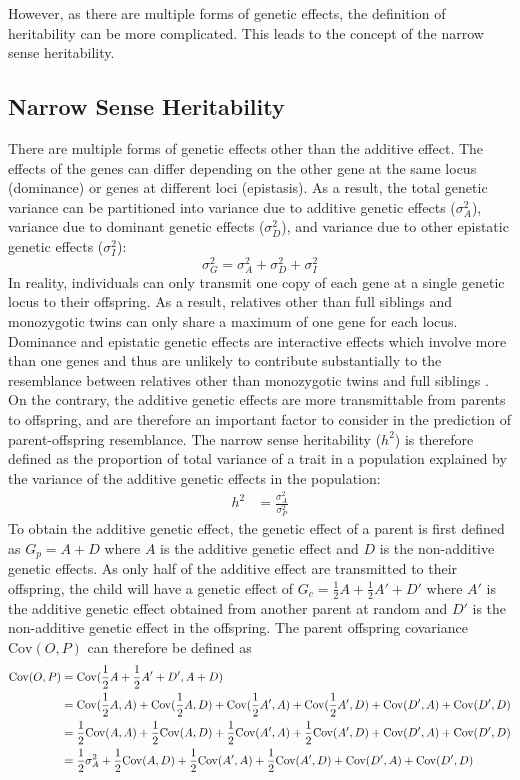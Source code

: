 \documentclass[12pt]{scrbook}
\begin{document}
However, as there are multiple forms of genetic effects, the definition of heritability can be more complicated. 
This leads to the concept of the narrow sense heritability.

\subsection{Narrow Sense Heritability}
There are multiple forms of genetic effects other than the additive effect. 
The effects of the genes can differ depending on the other gene at the same locus (dominance) or genes at different loci (epistasis).
As a result, the total genetic variance can be partitioned into variance due to additive genetic effects ($\sigma_A^2$), variance due to dominant genetic effects ($\sigma_D^2$), and variance due to other epistatic genetic effects ($\sigma_I^2$):
$$
\sigma_G^2=\sigma_A^2+\sigma_D^2+\sigma_I^2
$$
In reality, individuals can only transmit one copy of each gene at a single genetic locus to their offspring. 
As a result, relatives other than full siblings and monozygotic twins can only share a maximum of one gene for each locus. 
Dominance and epistatic genetic effects are interactive effects which involve more than one genes and thus are unlikely to contribute substantially to the resemblance between relatives other than monozygotic twins and full siblings \citep{Visscher2008}.
On the contrary, the additive genetic effects are more transmittable from parents to offspring, and are therefore an important factor to consider in the prediction of parent-offspring resemblance. 
The narrow sense heritability ($h^2$) is therefore defined as the proportion of total variance of a trait in a population explained by the variance of the additive genetic effects in the population:
\begin{align}
h^2&=\frac{\sigma_A^2}{\sigma_P^2}
\label{eq:narrowHeritability}
\end{align}
To obtain the additive genetic effect, the genetic effect of a parent is first defined as $G_p=A+D$ where $A$ is the additive genetic effect and $D$ is the non-additive genetic effects.
As only half of the additive effect are transmitted to their offspring, the child will have a genetic effect of $G_c=\frac{1}{2}A+\frac{1}{2}A'+D'$ where $A'$ is the additive genetic effect obtained from another parent at random and $D'$ is the non-additive genetic effect in the offspring.
The parent offspring covariance $\mathrm{Cov}(O,P)$ can therefore be defined as
\begin{align}
\mathrm{Cov}(O,P)&= \mathrm{Cov}(\frac{1}{2}A+\frac{1}{2}A'+D', A+D)  \notag\\
&= \mathrm{Cov}(\frac{1}{2}A, A)+\mathrm{Cov}(\frac{1}{2}A, D)+\mathrm{Cov}(\frac{1}{2}A', A)+\mathrm{Cov}(\frac{1}{2}A', D)+\mathrm{Cov}(D', A)+\mathrm{Cov}(D', D)\notag\\
&=\frac{1}{2}\mathrm{Cov}(A, A)+\frac{1}{2}\mathrm{Cov}(A, D)+\frac{1}{2}\mathrm{Cov}(A', A)+\frac{1}{2}\mathrm{Cov}(A', D)+\mathrm{Cov}(D', A)+\mathrm{Cov}(D', D)\notag\\
&=\frac{1}{2}\sigma_A^2+\frac{1}{2}\mathrm{Cov}(A, D)+\frac{1}{2}\mathrm{Cov}(A', A)+\frac{1}{2}\mathrm{Cov}(A', D)+\mathrm{Cov}(D', A)+\mathrm{Cov}(D', D) 
\label{eq:halfCompletedCovOP}
\end{align} 
\end{document}
